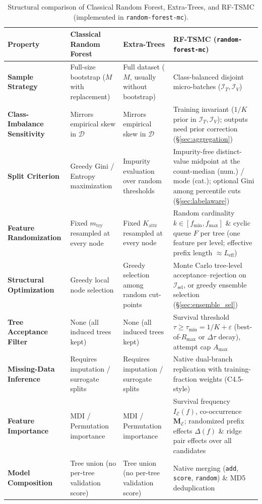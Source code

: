 \documentclass[11pt,a4paper]{article}
\newcommand{\code}[1]{\texttt{#1}}
\begin{document}
\begin{table}[htbp]
  \centering
  \caption{Structural comparison of Classical Random Forest, Extra-Trees, and RF-TSMC (implemented in \code{random-forest-mc}).}
  \label{tab:comparison}
  \footnotesize
  \renewcommand{\arraystretch}{1.28}
  \begin{tabularx}{\textwidth}{@{} >{\raggedright\arraybackslash}p{2.7cm} >{\raggedright\arraybackslash}X >{\raggedright\arraybackslash}X >{\raggedright\arraybackslash}X @{}}
    \toprule
    \textbf{Property} & \textbf{Classical Random Forest} \citep{breiman2001} & \textbf{Extra-Trees} \citep{geurts2006} & \textbf{RF-TSMC} (\code{random-forest-mc}) \\
    \midrule
    \textbf{Sample Strategy} & Full-size bootstrap ($M$ with replacement) & Full dataset ($M$, usually without bootstrap) & Class-balanced disjoint micro-batches ($\mathcal{I}_T, \mathcal{I}_V$) \\
    \textbf{Class-Imbalance Sensitivity} & Mirrors empirical skew in $\mathcal{D}$ & Mirrors empirical skew in $\mathcal{D}$ & Training invariant ($1/K$ prior in $\mathcal{I}_T, \mathcal{I}_V$); outputs need prior correction (\S\ref{sec:aggregation}) \\
    \textbf{Split Criterion} & Greedy Gini / Entropy maximization & Impurity evaluation over random thresholds & Impurity-free distinct-value midpoint at the count-median (num.) / mode (cat.); optional Gini among percentile cuts (\S\ref{sec:labelaware}) \\
    \textbf{Feature Randomization} & Fixed $m_{\text{try}}$ resampled at every node & Fixed $K_{\text{attr}}$ resampled at every node & Random cardinality $k \in [f_{\min}, f_{\max}]$ \& cyclic queue $F$ per tree (one feature per level; effective prefix length $\approx L_{\text{eff}}$) \\
    \textbf{Structural Optimization} & Greedy local node selection & Greedy selection among random cut-points & Monte Carlo tree-level acceptance--rejection on $\mathcal{I}_{\text{sel}}$, or greedy ensemble selection (\S\ref{sec:ensemble_sel}) \\
    \textbf{Tree Acceptance Filter} & None (all induced trees kept) & None (all induced trees kept) & Survival threshold $\tau \ge \tau_{\min} = 1/K + \varepsilon$ (best-of-$R_{\max}$ or $\Delta\tau$ decay), attempt cap $A_{\max}$ \\
    \textbf{Missing-Data Inference} & Requires imputation / surrogate splits & Requires imputation / surrogate splits & Native dual-branch replication with training-fraction weights (C4.5-style) \\
    \textbf{Feature Importance} & MDI / Permutation importance & MDI / Permutation importance & Survival frequency $I_{\mathcal{E}}(f)$, co-occurrence $\mathbf{M}_{\mathcal{E}}$; randomized prefix effects $\Delta(f)$ \& ridge pair effects over all candidates \\
    \textbf{Model Composition} & Tree union (no per-tree validation score) & Tree union (no per-tree validation score) & Native merging (\code{add}, \code{score}, \code{random}) \& MD5 deduplication \\
    \bottomrule
  \end{tabularx}
\end{table}
\end{document}

